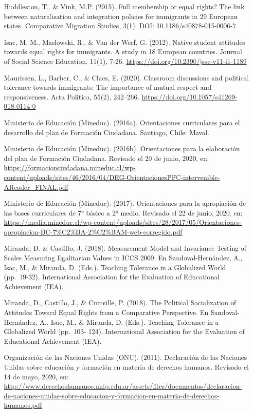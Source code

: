 \documentclass[12pt,twoside]{templates/facsothesis}
\begin{document}
Huddleston, T., \& Vink, M.P. (2015). Full membership or equal rights? The link between naturalisation and integration policies for immigrants in 29 European states. Comparative Migration Studies, 3(1). DOI: 10.1186/s40878-015-0006-7

Isac, M. M., Maslowski, R., \& Van der Werf, G. (2012). Native student attitudes towards equal rights for immigrants. A study in 18 European countries. Journal of Social Science Education, 11(1), 7-26. \url{https://doi.org/10.2390/jsse-v11-i1-1189}

Maurissen, L., Barber, C., \& Claes, E. (2020). Classroom discussions and political tolerance towards immigrants: The importance of mutual respect and responsiveness. Acta Politica, 55(2), 242--266. \url{https://doi.org/10.1057/s41269-018-0114-0}

Ministerio de Educación (Mineduc). (2016a). Orientaciones curriculares para el desarrollo del plan de Formación Ciudadana. Santiago, Chile: Maval.

Ministerio de Educación (Mineduc). (2016b). Orientaciones para la elaboración del plan de Formación Ciudadana. Revisado el 20 de junio, 2020, en: \url{https://formacionciudadana.mineduc.cl/wp-content/uploads/sites/46/2016/04/DEG-OrientacionesPFC-intervenible-AReader_FINAL.pdf}

Ministerio de Educación (Mineduc). (2017). Orientaciones para la apropiación de las bases curriculares de 7° básico a 2° medio. Revisado el 22 de junio, 2020, en: \url{https://media.mineduc.cl/wp-content/uploads/sites/28/2017/05/Orientaciones-apropiacion-BC-7\%C2\%BA-2\%C2\%BAM-web-corregido.pdf}

Miranda, D. \& Castillo, J. (2018). Measurement Model and Invariance Testing of Scales Measuring Egalitarian Values in ICCS 2009. En Sandoval-Hernández, A., Isac, M., \& Miranda, D. (Eds.). Teaching Tolerance in a Globalized World (pp.~19-32). International Association for the Evaluation of Educational Achievement (IEA).

Miranda, D., Castillo, J., \& Cumsille, P. (2018). The Political Socialization of Attitudes Toward Equal Rights from a Comparative Perspective. En Sandoval-Hernández, A., Isac, M., \&
Miranda, D. (Eds.). Teaching Tolerance in a Globalized World (pp.~103- 124). International Association for the Evaluation of Educational Achievement (IEA).

Organización de las Naciones Unidas (ONU). (2011). Declaración de las Naciones Unidas sobre educación y formación en materia de derechos humanos. Revisado el 14 de mayo, 2020, en: \url{http://www.derechoshumanos.unlp.edu.ar/assets/files/documentos/declaracion-de-naciones-unidas-sobre-educacion-y-formacion-en-materia-de-derechos-humanos.pdf}
\end{document}
